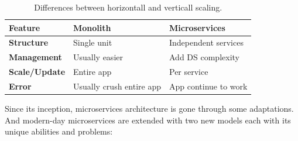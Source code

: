\begin{table}[h!]
	\begin{center}
		\begin{tabular}{l|l|l}
			\textbf{Feature} & \textbf{Monolith} & \textbf{Microservices}\\
			\hline
			\textbf{Structure} & Single unit & Independent services \\
			\textbf{Management} & Usually easier & Add DS complexity\\
			\textbf{Scale/Update} & Entire app & Per service \\
			\textbf{Error} & Usually crush entire app & App continue to work \\
		\end{tabular}
	\end{center}
	\vspace{-0.5cm}
	\caption{Differences between horizontall and verticall scaling.}
	\label{tab:table3}
\end{table}

\noindent
Since its inception, microservices architecture is gone through some adaptations. And modern-day microservices are extended with two new models each with its unique abilities and problems:

